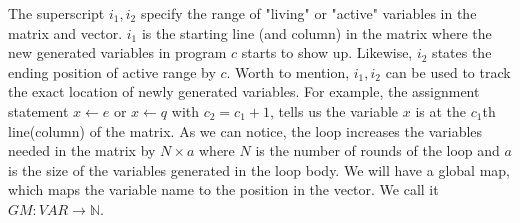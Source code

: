 \documentclass[a4paper,11pt]{article}
\begin{document}
The superscript $i_1,i_2$  specify the range of "living" or "active" variables in the matrix and vector. $i_1$ is the starting line (and column) in the matrix where the new generated variables in program $c$ starts to show up. Likewise, $i_2$ states the ending position of active range by $c$.
 Worth to mention, $i_1,i_2$ can be used to track the exact location of newly generated variables. For example, the assignment statement $x \leftarrow e$ or $x \leftarrow q $ with $c_2 =c_1+1$, tells us the variable $x$ is at the $c_1$th line(column) of the matrix. As we can notice, the loop increases the variables needed in the matrix by $N \times a$ where $N$ is the number of rounds of the loop and $a$ is the size of the variables generated in the loop body. We will have a global map, which maps the variable name to the position in the vector. We call it $GM: VAR \to \mathbb{N}$.
\end{document}
